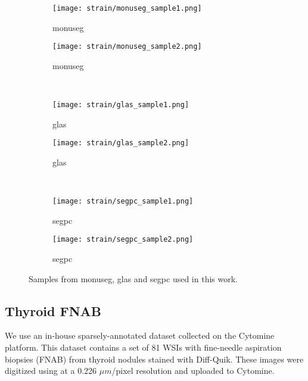 \begin{figure}
  \centering
  \begin{subfigure}{0.48\textwidth}
    \centering
    \texttt{[image: strain/monuseg\_sample1.png]}
    \caption{\acrshort{monuseg}}
    \label{sfig:strain:monuseg_sample1}
  \end{subfigure}
  \begin{subfigure}{0.48\textwidth}
    \centering
    \texttt{[image: strain/monuseg\_sample2.png]}
    \caption{\acrshort{monuseg}}
    \label{sfig:strain:monuseg_sample2}
  \end{subfigure} \\

  \begin{subfigure}{0.48\textwidth}
    \centering
    \texttt{[image: strain/glas\_sample1.png]}
    \caption{\acrshort{glas}}
    \label{sfig:strain:glas_sample1}
  \end{subfigure}
  \begin{subfigure}{0.48\textwidth}
    \centering
    \texttt{[image: strain/glas\_sample2.png]}
    \caption{\acrshort{glas}}
    \label{sfig:strain:glas_sample2}
  \end{subfigure} \\

  \begin{subfigure}{0.48\textwidth}
    \centering
    \texttt{[image: strain/segpc\_sample1.png]}
    \caption{\acrshort{segpc}}
    \label{sfig:strain:segpc_sample1}
  \end{subfigure}
  \begin{subfigure}{0.48\textwidth}
    \centering
    \texttt{[image: strain/segpc\_sample2.png]}
    \caption{\acrshort{segpc}}
    \label{sfig:strain:segpc_sample2}
  \end{subfigure} 
  
  \caption{Samples from \acrshort{monuseg}, \acrshort{glas} and \acrshort{segpc} used in this work.}
  \label{fig:strain:datasets_samples}
\end{figure}


\subsection{Thyroid FNAB}
\label{ssec:strain:thyroidfnab}

We use an in-house sparsely-annotated dataset collected on the Cytomine platform. This dataset contains a set of 81 WSIs with fine-needle aspiration biopsies (FNAB) from thyroid nodules stained with Diff-Quik. These images were digitized using  at a 0.226 $\mu m$/pixel resolution and uploaded to Cytomine. 

